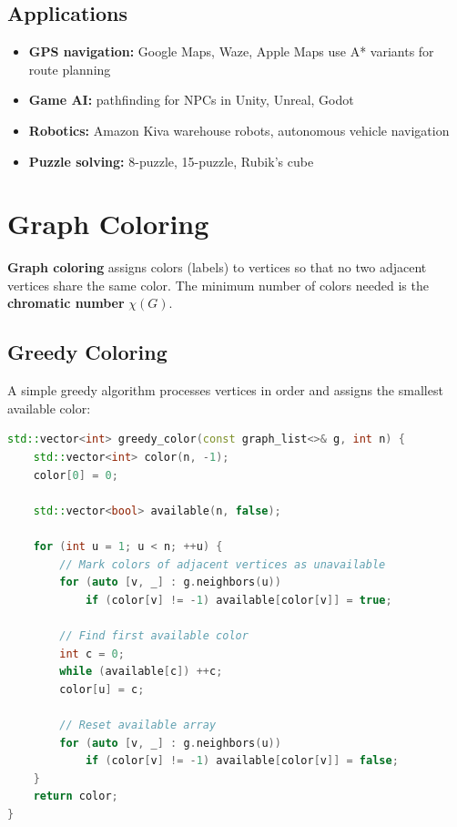 \subsection{Applications}

\begin{itemize}
\item \textbf{GPS navigation:} Google Maps, Waze, Apple Maps use A* variants for route planning
\item \textbf{Game AI:} pathfinding for NPCs in Unity, Unreal, Godot
\item \textbf{Robotics:} Amazon Kiva warehouse robots, autonomous vehicle navigation
\item \textbf{Puzzle solving:} 8-puzzle, 15-puzzle, Rubik's cube
\end{itemize}

\section{Graph Coloring}

\textbf{Graph coloring} assigns colors (labels) to vertices so that no two adjacent vertices share the same color. The minimum number of colors needed is the \textbf{chromatic number} $\chi(G)$.

\subsection{Greedy Coloring}

A simple greedy algorithm processes vertices in order and assigns the smallest available color:

\begin{lstlisting}[language=C++]
std::vector<int> greedy_color(const graph_list<>& g, int n) {
    std::vector<int> color(n, -1);
    color[0] = 0;

    std::vector<bool> available(n, false);

    for (int u = 1; u < n; ++u) {
        // Mark colors of adjacent vertices as unavailable
        for (auto [v, _] : g.neighbors(u))
            if (color[v] != -1) available[color[v]] = true;

        // Find first available color
        int c = 0;
        while (available[c]) ++c;
        color[u] = c;

        // Reset available array
        for (auto [v, _] : g.neighbors(u))
            if (color[v] != -1) available[color[v]] = false;
    }
    return color;
}
\end{lstlisting}

